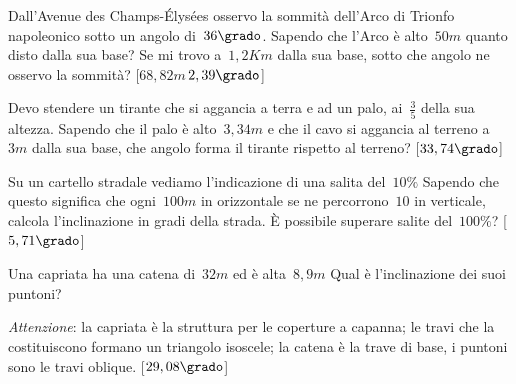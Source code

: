 \begin{multicols}{2}
\begin{esercizio}[\Ast]
\label{ese:G.62}
Dall'Avenue des Champs-Élysées osservo la sommità dell'Arco di Trionfo 
napoleonico sotto un angolo di~$36\grado$.
Sapendo che l'Arco è alto~$50\unit{m}$ quanto disto dalla sua base? Se mi trovo 
a~$1,2\unit{Km}$ dalla sua base,
sotto che angolo ne osservo la sommità?
\hfill [$68,82\unit{m}$\,$2,39\grado$]
\end{esercizio}

\begin{esercizio}[\Ast]
\label{ese:G.63}
Devo stendere un tirante che si aggancia a terra e ad un palo, ai~$\frac{3}{5}$ 
della sua altezza.
Sapendo che il palo è alto~$3,34\unit{m}$ e che il cavo si aggancia al terreno 
a~$3\unit{m}$ dalla sua base,
che angolo forma il tirante rispetto al terreno?
\hfill [$33,74\grado$]
\end{esercizio}

\begin{esercizio}[\Ast]
\label{ese:G.64}
Su un cartello stradale vediamo l'indicazione di una salita del~$10\%$ Sapendo 
che questo significa che ogni~$100\unit{m}$
in orizzontale se ne percorrono~$10$ in verticale, calcola l'inclinazione in 
gradi della strada. È possibile superare salite del~$100\%$?
\hfill [$5,71\grado$]
\end{esercizio}

\begin{esercizio}[\Ast]
\label{ese:G.65}
Una capriata ha una catena di~$32\unit{m}$ ed è alta~$8,9\unit{m}$ Qual è 
l'inclinazione dei suoi puntoni?

\emph{Attenzione}: la capriata è la struttura per le coperture a 
{\textquotedbl}capanna{\textquotedbl}; le travi che la costituiscono
formano un triangolo isoscele; la catena è la trave di base, i puntoni sono le 
travi oblique.
\hfill [$29,08\grado$]
\end{esercizio}

% 
\end{multicols}


